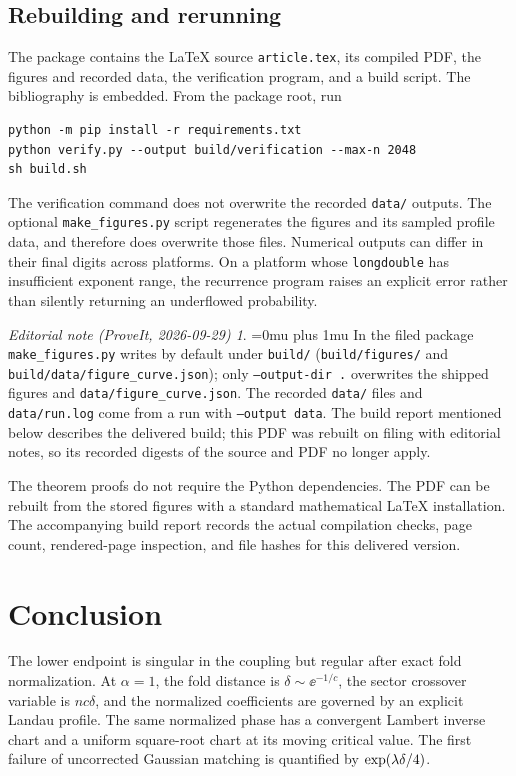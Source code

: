 \documentclass[11pt,a4paper]{article}
\numberwithin{equation}{section}
\theoremstyle{definition}
\theoremstyle{remark}
\newtheorem*{ednoteinner}{Editorial note (ProveIt, 2026-09-29)}
\newenvironment{ednote}{\begin{ednoteinner}\sloppy\Urlmuskip=0mu plus 1mu\relax}{\end{ednoteinner}}
\begin{document}
\subsection{Rebuilding and rerunning}
The package contains the LaTeX source \texttt{article.tex}, its
compiled PDF, the figures and recorded data, the verification program,
and a build script. The bibliography is embedded. From the package
root, run
\begin{verbatim}
python -m pip install -r requirements.txt
python verify.py --output build/verification --max-n 2048
sh build.sh
\end{verbatim}
The verification command does not overwrite the recorded \texttt{data/}
outputs. The optional \texttt{make\_figures.py} script regenerates the
figures and its sampled profile data, and therefore does overwrite
those files. Numerical outputs can differ in their final digits across
platforms. On a platform whose \texttt{longdouble} has insufficient
exponent range, the recurrence program raises an explicit error rather
than silently returning an underflowed probability.
\begin{ednote}
In the filed package \texttt{make\_figures.py} writes by default under
\texttt{build/} (\texttt{build/figures/} and
\texttt{build/data/figure\_curve.json}); only
\mbox{\texttt{--output-dir .}} overwrites the shipped figures and
\texttt{data/figure\_curve.json}. The recorded \texttt{data/} files and
\texttt{data/run.log} come from a run with \texttt{--output data}. The
build report mentioned below describes the delivered build; this PDF was
rebuilt on filing with editorial notes, so its recorded digests of the
source and PDF no longer apply.
\end{ednote}

The theorem proofs do not require the Python dependencies. The PDF can
be rebuilt from the stored figures with a standard mathematical LaTeX
installation. The accompanying build report records the actual
compilation checks, page count, rendered-page inspection, and file
hashes for this delivered version.

\section{Conclusion}
The lower endpoint is singular in the coupling but regular after exact
fold normalization. At \(\alpha=1\), the fold distance is
\(\delta\sim\ee^{-1/c}\), the sector crossover variable is
\(nc\delta\), and the normalized coefficients are governed by an
explicit Landau profile. The same normalized phase has a convergent
Lambert inverse chart and a uniform square-root chart at its moving
critical value. The first failure of uncorrected Gaussian matching is
quantified by \(\exp(\lambda\delta/4)\).
\end{document}
